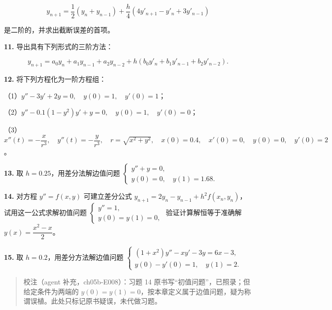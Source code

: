 \[
y_{n+1}=\frac12(y_n+y_{n-1})+\frac h4(4y'_{n+1}-y'_n+3y'_{n-1})
\]

是二阶的，并求出截断误差的首项。

\textbf{11.} 导出具有下列形式的三阶方法：

\[
y_{n+1}=a_0y_n+a_1y_{n-1}+a_2y_{n-2}+h(b_0y'_n+b_1y'_{n-1}+b_2y'_{n-2}).
\]

\textbf{12.} 将下列方程化为一阶方程组：

（1）\(y''-3y'+2y=0,\quad y(0)=1,\quad y'(0)=1\)；

（2）\(y''-0.1(1-y^2)y'+y=0,\quad y(0)=1,\quad y'(0)=0\)；

（3）\(x''(t)=-\dfrac{x}{r^3},\allowbreak \quad y''(t)=-\dfrac{y}{r^3},\allowbreak \quad r=\sqrt{x^2+y^2},\allowbreak \quad x(0)=0.4,\allowbreak \quad x'(0)=0,\allowbreak \quad y(0)=0,\allowbreak \quad y'(0)=2\)。

\textbf{13.} 取 \(h=0.25\)，用差分法解边值问题 \(\begin{cases}y''+y=0,\\y(0)=0,\quad y(1)=1.68.\end{cases}\)

\textbf{14.} 对方程 \(y''=f(x,y)\) 可建立差分公式 \(y_{n+1}=2y_n-y_{n-1}+h^2f(x_n,y_n)\)，试用这一公式求解初值问题 \(\begin{cases}y''=1,\\y(0)=y(1)=0,\end{cases}\) 验证计算解恒等于准确解 \(y(x)=\dfrac{x^2-x}{2}\)。

\textbf{15.} 取 \(h=0.2\)，用差分方法解边值问题 \(\begin{cases}(1+x^2)y''-xy'-3y=6x-3,\\y(0)-y'(0)=1,\quad y(1)=2.\end{cases}\)

\begin{quote}
校注（agent 补充，ch05b-E008）：习题 14 原书写``初值问题''，已照录；但给定条件为两端的 \(y(0)=y(1)=0\)，按本章定义属于边值问题，疑为称谓误植。此处只标记原书疑误，未代做习题。
\end{quote}

